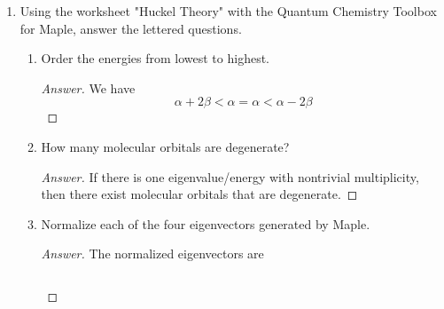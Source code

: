 \documentclass[../psets.tex]{subfiles}
\begin{document}
\begin{enumerate}
\begin{enumerate}
        \begin{proof}[Answer]
            We have
            \begin{align*}
                \begin{split}
                    \psi ={}& \sigma_g1s\alpha(1)\wedge\sigma_g1s\beta(2)\wedge\sigma_u1s\alpha(3)\wedge\sigma_u1s\beta(4)\wedge\sigma_g2s\alpha(5)\wedge\sigma_g2s\beta(6)\wedge\sigma_u2s\alpha(7)\wedge\sigma_u2s\beta(8)\\
                    & \wedge\pi_u2p_x\alpha(9)\wedge\pi_u2p_x\beta(10)\wedge\pi_u2p_y\alpha(11)\wedge\pi_u2p_y\beta(12)\wedge\sigma_g2p_z\alpha(13)\wedge\sigma_g2p_z\beta(14)
                \end{split}
            \end{align*}
            where $\psi=\psi(1,2,3,4,5,6,7,8,9,10,11,12,13,14)$ is a function of the fourteen sets of four (three spatial and one spin) coordinates describing each electron.
        \end{proof}
    \end{enumerate}
    \item Using the worksheet "Huckel Theory" with the Quantum Chemistry Toolbox for Maple, answer the lettered questions.
    \begin{enumerate}
        \item Order the energies from lowest to highest.
        \begin{proof}[Answer]
            We have
            \begin{equation*}
                \boxed{\alpha+2\beta < \alpha = \alpha < \alpha-2\beta}
            \end{equation*}
        \end{proof}
        \item How many molecular orbitals are degenerate?
        \begin{proof}[Answer]
            If there is one eigenvalue/energy with nontrivial multiplicity, then there exist  molecular orbitals that are degenerate.
        \end{proof}
        \item Normalize each of the four eigenvectors generated by Maple.
        \begin{proof}[Answer]
            The normalized eigenvectors are
            \begin{figure}[h!]
                \centering
                \begin{subfigure}[b]{0.2\linewidth}
                    \centering
                    \begin{equation*}

\end{equation*}
\end{subfigure}
\end{figure}
\end{proof}
\end{enumerate}
\end{enumerate}
\end{document}

